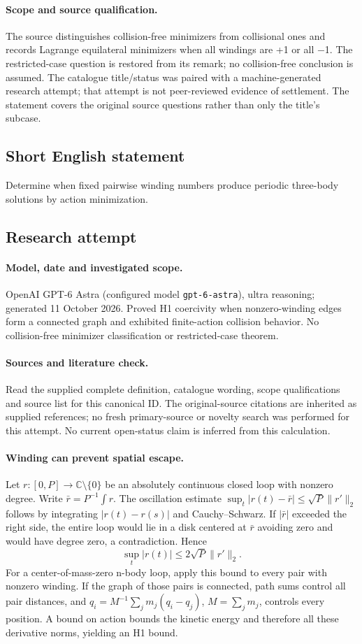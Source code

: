 \documentclass[11pt]{article}
\begin{document}
\paragraph{Scope and source qualification.}The source distinguishes collision-free minimizers from collisional ones and records Lagrange equilateral minimizers when all windings are +1 or all −1. The restricted-case question is restored from its remark; no collision-free conclusion is assumed. The catalogue title/status was paired with a machine-generated research attempt; that attempt is not peer-reviewed evidence of settlement. The statement covers the original source questions rather than only the title’s subcase.
\subsection{Short English statement}
Determine when fixed pairwise winding numbers produce periodic three-body solutions by action minimization.
\subsection{Research attempt}
\paragraph{Model, date and investigated scope.}
OpenAI GPT-6 Astra (configured model \texttt{gpt-6-astra}), ultra reasoning; generated 11 October 2026. Proved H1 coercivity when nonzero-winding edges form a connected graph and exhibited finite-action collision behavior. No collision-free minimizer classification or restricted-case theorem.

\paragraph{Sources and literature check.}
Read the supplied complete definition, catalogue wording, scope qualifications and source list for this canonical ID. The original-source citations are inherited as supplied references; no fresh primary-source or novelty search was performed for this attempt. No current open-status claim is inferred from this calculation.

\paragraph{Winding can prevent spatial escape.}Let \(r:[0,P]\to\mathbb C\setminus\{0\}\) be an absolutely continuous closed loop with nonzero degree. Write \(\bar r=P^{-1}\int r\). The oscillation estimate \(\sup_t|r(t)-\bar r|\le\sqrt P\|r'\|_2\) follows by integrating \(|r(t)-r(s)|\) and Cauchy--Schwarz. If \(|\bar r|\) exceeded the right side, the entire loop would lie in a disk centered at \(\bar r\) avoiding zero and would have degree zero, a contradiction. Hence
\[\sup_t|r(t)|\le2\sqrt P\|r'\|_2.
\]
For a center-of-mass-zero n-body loop, apply this bound to every pair with nonzero winding. If the graph of those pairs is connected, path sums control all pair distances, and \(q_i=M^{-1}\sum_jm_j(q_i-q_j)\), \(M=\sum_jm_j\), controls every position. A bound on action bounds the kinetic energy and therefore all these derivative norms, yielding an H1 bound.
\end{document}
